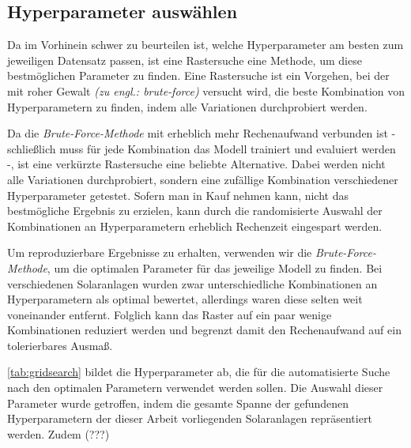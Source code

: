 \documentclass[12pt, a4paper]{article}
\begin{document}
%

\subsection{Hyperparameter auswählen}

Da im Vorhinein schwer zu beurteilen ist, welche Hyperparameter am besten zum jeweiligen Datensatz passen, ist eine Rastersuche eine Methode, um diese bestmöglichen Parameter zu finden. Eine Rastersuche ist ein Vorgehen, bei der mit roher Gewalt \textit{(zu engl.: brute-force)} versucht wird, die beste Kombination von Hyperparametern zu finden, indem alle Variationen durchprobiert werden.

Da die \textit{Brute-Force-Methode} mit erheblich mehr Rechenaufwand verbunden ist - schließlich muss für jede Kombination das Modell trainiert und evaluiert werden -, ist eine verkürzte Rastersuche eine beliebte Alternative. Dabei werden nicht alle Variationen durchprobiert, sondern eine zufällige Kombination verschiedener Hyperparameter getestet. Sofern man in Kauf nehmen kann, nicht das bestmögliche Ergebnis zu erzielen, kann durch die randomisierte Auswahl der Kombinationen an Hyperparametern erheblich Rechenzeit eingespart werden.

Um reproduzierbare Ergebnisse zu erhalten, verwenden wir die \textit{Brute-Force-Methode}, um die optimalen Parameter für das jeweilige Modell zu finden. Bei verschiedenen Solaranlagen wurden zwar unterschiedliche Kombinationen an Hyperparametern als optimal bewertet, allerdings waren diese selten weit voneinander entfernt. Folglich kann das Raster auf ein paar wenige Kombinationen reduziert werden und begrenzt damit den Rechenaufwand auf ein tolerierbares Ausmaß.

\autoref{tab:gridsearch} bildet die Hyperparameter ab, die für die automatisierte Suche nach den optimalen Parametern verwendet werden sollen. Die Auswahl dieser Parameter wurde getroffen, indem die gesamte Spanne der gefundenen Hyperparametern der dieser Arbeit vorliegenden Solaranlagen repräsentiert werden. Zudem (???)
\end{document}
